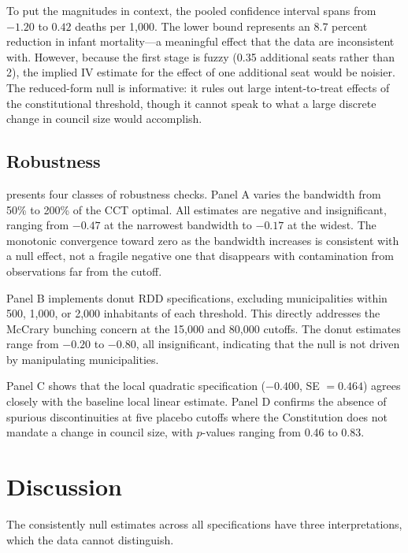 \documentclass[12pt]{article}
\begin{document}
To put the magnitudes in context, the pooled confidence interval spans from $-1.20$ to $0.42$ deaths per 1,000. The lower bound represents an 8.7 percent reduction in infant mortality---a meaningful effect that the data are inconsistent with. However, because the first stage is fuzzy (0.35 additional seats rather than 2), the implied IV estimate for the effect of one additional seat would be noisier. The reduced-form null is informative: it rules out large intent-to-treat effects of the constitutional threshold, though it cannot speak to what a large discrete change in council size would accomplish.





\subsection{Robustness}

 presents four classes of robustness checks. Panel A varies the bandwidth from 50\% to 200\% of the CCT optimal. All estimates are negative and insignificant, ranging from $-0.47$ at the narrowest bandwidth to $-0.17$ at the widest. The monotonic convergence toward zero as the bandwidth increases is consistent with a null effect, not a fragile negative one that disappears with contamination from observations far from the cutoff.

Panel B implements donut RDD specifications, excluding municipalities within 500, 1,000, or 2,000 inhabitants of each threshold. This directly addresses the McCrary bunching concern at the 15,000 and 80,000 cutoffs. The donut estimates range from $-0.20$ to $-0.80$, all insignificant, indicating that the null is not driven by manipulating municipalities.

Panel C shows that the local quadratic specification ($-0.400$, SE $= 0.464$) agrees closely with the baseline local linear estimate. Panel D confirms the absence of spurious discontinuities at five placebo cutoffs where the Constitution does not mandate a change in council size, with $p$-values ranging from 0.46 to 0.83.




\section{Discussion}

The consistently null estimates across all specifications have three interpretations, which the data cannot distinguish.
\end{document}
